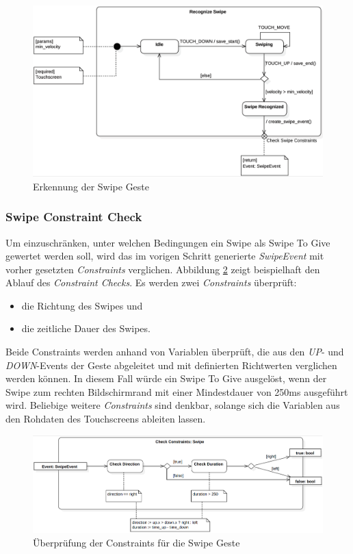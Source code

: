 {\begin{figure}[h]
\includegraphics[width=\textwidth]{swipe_recognize.png}
\caption{Erkennung der Swipe Geste}
\label{recognize_swipe}
\end{figure}

\subsubsection*{Swipe Constraint Check}
Um einzuschränken, unter welchen Bedingungen ein Swipe als Swipe To Give gewertet werden soll, wird das im vorigen Schritt generierte \textit{SwipeEvent} mit vorher gesetzten \textit{Constraints} verglichen. Abbildung \ref{check_constraints} zeigt beispielhaft den Ablauf des \textit{Constraint Checks}. Es werden zwei \textit{Constraints} überprüft:
\begin{itemize}
\item die Richtung des Swipes und
\item die zeitliche Dauer des Swipes.
\end{itemize}
Beide Constraints werden anhand von Variablen überprüft, die aus den \textit{UP}- und \textit{DOWN}-Events der Geste abgeleitet und mit definierten Richtwerten verglichen werden können. In diesem Fall würde ein Swipe To Give ausgelöst, wenn der Swipe zum rechten Bildschirmrand mit einer Mindestdauer von 250ms ausgeführt wird. Beliebige weitere \textit{Constraints} sind denkbar, solange sich die Variablen aus den Rohdaten des Touchscreens ableiten lassen.

\begin{figure}[h]
\includegraphics[width=\textwidth]{swipe_check_constraints.png}
\caption{Überprüfung der Constraints für die Swipe Geste}
\label{check_constraints}
\end{figure}

}
